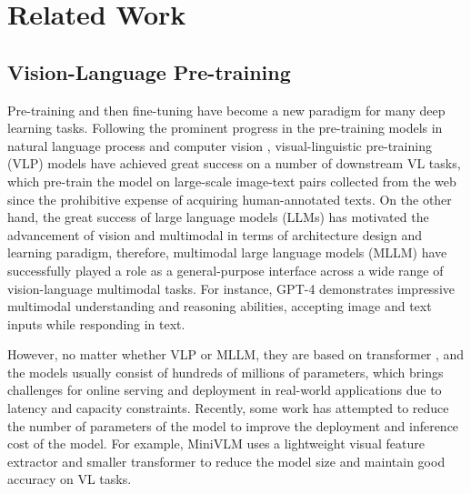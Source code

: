 \documentclass[10pt,twocolumn,letterpaper]{article}
\begin{document}

\section{Related Work}
\subsection{Vision-Language Pre-training}
Pre-training and then fine-tuning have become a new paradigm for many deep learning tasks. 
Following the prominent progress in the pre-training models in natural language process \cite{vaswani2017attention, devlin2018bert, brown2020language, liu2019roberta, sanh2019distilbert, gururangan2020don} and computer vision \cite{he2022masked, he2020momentum, chen2020simple, chen2021empirical, bao2021beit, wei2022masked}, visual-linguistic pre-training (VLP) models have achieved great success on a number of downstream VL tasks, which pre-train the model on large-scale image-text pairs collected from the web since the prohibitive expense of acquiring human-annotated texts.
On the other hand, the great success of large language models (LLMs) \cite{brown2020language,ouyang2022training,hoffmann2022training,chung2022scaling} has
motivated the advancement of vision and multimodal in terms of architecture design and learning paradigm, therefore, multimodal large language models (MLLM) \cite{li2023blip,liu2023visual,peng2023instruction,liu2023aligning, ye2023mplug, openai2023gpt} have successfully played a role as a general-purpose interface across a wide range of vision-language multimodal tasks.
For instance, GPT-4 \cite{openai2023gpt} demonstrates impressive multimodal understanding and reasoning abilities, accepting image and text inputs while responding in text.

However, no matter whether VLP or MLLM, they are based on transformer \cite{dosovitskiy2020image}, and the models usually consist of hundreds of millions of parameters, which brings challenges for online serving and deployment in real-world applications due to latency and capacity constraints. 
Recently, some work has attempted to reduce the number of parameters of the model to improve the deployment and inference cost of the model. For example, MiniVLM \cite{wang2020minivlm} uses a lightweight visual feature extractor and smaller transformer to reduce the model size and maintain good accuracy on VL tasks.
\end{document}
